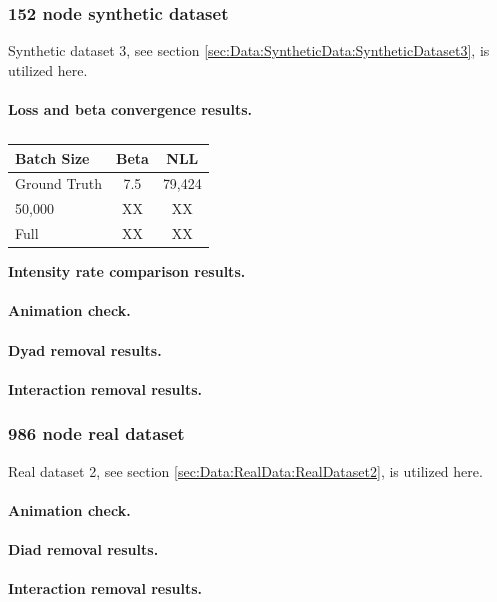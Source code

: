 






\subsubsection{152 node synthetic dataset}
\label{sec:ResearchQuestion2:150nodeSynthetic}

Synthetic dataset 3, see section \ref{sec:Data:SyntheticData:SyntheticDataset3}, is utilized here.
\\\\
\textbf{Loss and beta convergence results.}

\begin{table}[h!]
\centering
\begin{tabular}{|l|cc|}
\hline
Batch Size   & Beta & NLL\\ \hline
Ground Truth & 7.5  & 79,424      \\
50,000          & XX   & XX       \\
Full          & XX   & XX       \\
\hline
\end{tabular}
\caption{}
\label{tab:SingleStep1}
\end{table}
\noindent \textbf{Intensity rate comparison results.}
\\\\
\textbf{Animation check.}
\\\\
\textbf{Dyad removal results.}
\\\\
\textbf{Interaction removal results.}
   



\subsubsection{986 node real dataset}
\label{sec:ResearchQuestion2:986nodeReal}

Real dataset 2, see section \ref{sec:Data:RealData:RealDataset2}, is utilized here.
\\\\
\textbf{Animation check.}
\\\\
\textbf{Diad removal results.}
\\\\
\textbf{Interaction removal results.}

